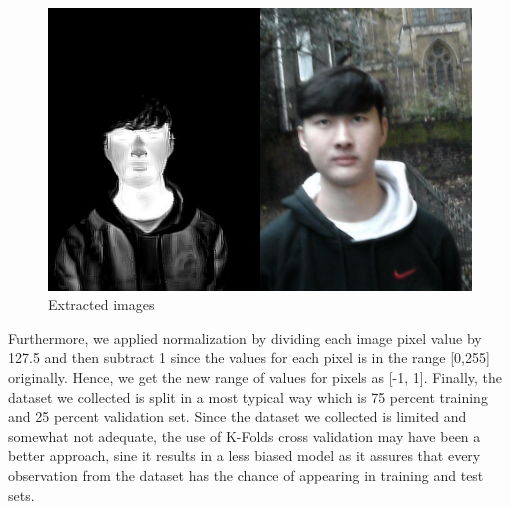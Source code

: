 \documentclass[conference]{IEEEtran}
\begin{document}
\begin{figure}[htbp]
\centerline{\includegraphics[scale=0.25]{92.jpg}}
\caption{Extracted images}
\label{fig}
\end{figure}

Furthermore, we applied normalization by dividing each image pixel value by 127.5 and then subtract 1 since the values for each pixel is in the range [0,255] originally. Hence, we get the new range of values for pixels as [-1, 1]. Finally, the dataset we collected is split in a most typical way which is 75 percent training and 25 percent validation set. Since the dataset we collected is limited and somewhat not adequate, the use of K-Folds cross validation may have been a better approach, sine it results in a less biased model as it assures that every observation from the dataset has the chance of appearing in training and test sets. 
\\
\end{document}
